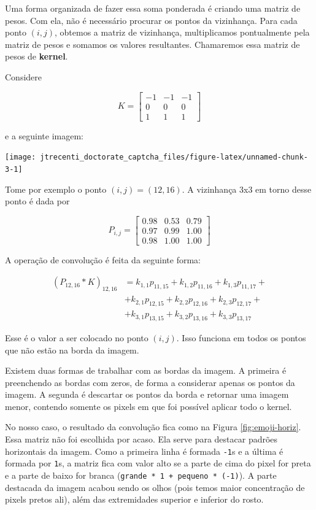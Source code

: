 \documentclass[12pt,]{report}
\begin{document}
Uma forma organizada de fazer essa soma ponderada é criando uma matriz
de pesos. Com ela, não é necessário procurar os pontos da vizinhança.
Para cada ponto \((i,j)\), obtemos a matriz de vizinhança, multiplicamos
pontualmente pela matriz de pesos e somamos os valores resultantes.
Chamaremos essa matriz de pesos de \textbf{kernel}.

Considere

\[
K = \left[\begin{array}{rrr}-1&-1&-1\\0&0&0\\1&1&1\end{array}\right]
\]

e a seguinte imagem:

\begin{center}\texttt{[image: jtrecenti\_doctorate\_captcha\_files/figure-latex/unnamed-chunk-3-1]} \end{center}

Tome por exemplo o ponto \((i,j) = (12,16)\). A vizinhança 3x3 em torno
desse ponto é dada por

\[
P_{i,j} = \left[\begin{array}{rrr}
0.98 & 0.53 & 0.79 \\ 
0.97 & 0.99 & 1.00 \\ 
0.98 & 1.00 & 1.00 
\end{array}\right]
\]

A operação de convolução é feita da seguinte forma:

\[
\begin{aligned}
(P_{12,16} *K )_{12,16}
&= k_{1,1}p_{11,15} + k_{1,2}p_{11,16} + k_{1,3}p_{11,17} + \\
&+ k_{2,1}p_{12,15} + k_{2,2}p_{12,16} + k_{2,3}p_{12,17} + \\
&+ k_{3,1}p_{13,15} + k_{3,2}p_{13,16} + k_{3,3}p_{13,17}
\end{aligned}
\]

Esse é o valor a ser colocado no ponto \((i,j)\). Isso funciona em todos
os pontos que não estão na borda da imagem.

Existem duas formas de trabalhar com as bordas da imagem. A primeira é
preenchendo as bordas com zeros, de forma a considerar apenas os pontos
da imagem. A segunda é descartar os pontos da borda e retornar uma
imagem menor, contendo somente os pixels em que foi possível aplicar
todo o kernel.

No nosso caso, o resultado da convolução fica como na Figura
\ref{fig:emoji-horiz}. Essa matriz não foi escolhida por acaso. Ela
serve para destacar padrões horizontais da imagem. Como a primeira linha
é formada \texttt{-1}s e a última é formada por \texttt{1}s, a matriz
fica com valor alto se a parte de cima do pixel for preta e a parte de
baixo for branca (\texttt{grande\ *\ 1\ +\ pequeno\ *\ (-1)}). A parte
destacada da imagem acabou sendo os olhos (pois temos maior concentração
de pixels pretos ali), além das extremidades superior e inferior do
rosto.
\end{document}
